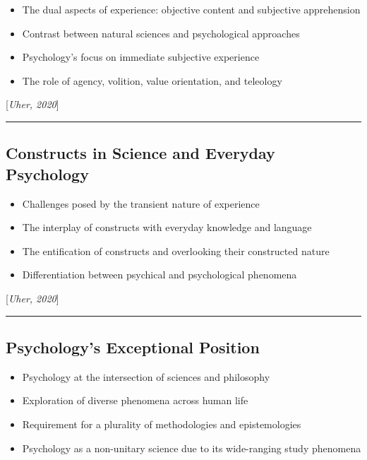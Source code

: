 \documentclass[
  letterpaper,
  DIV=11,
  numbers=noendperiod]{scrartcl}
\providecommand{\tightlist}{%
  \setlength{\itemsep}{0pt}\setlength{\parskip}{0pt}}\usepackage{longtable,booktabs,array}
\begin{document}
\begin{itemize}
\tightlist
\item
  The dual aspects of experience: objective content and subjective
  apprehension
\item
  Contrast between natural sciences and psychological approaches
\item
  Psychology's focus on immediate subjective experience
\item
  The role of agency, volition, value orientation, and teleology
\end{itemize}

{[}\emph{Uher, 2020}{]}

\begin{center}\rule{0.5\linewidth}{0.5pt}\end{center}

\subsection{Constructs in Science and Everyday
Psychology}\label{constructs-in-science-and-everyday-psychology}

\begin{itemize}
\tightlist
\item
  Challenges posed by the transient nature of experience
\item
  The interplay of constructs with everyday knowledge and language
\item
  The entification of constructs and overlooking their constructed
  nature
\item
  Differentiation between psychical and psychological phenomena
\end{itemize}

{[}\emph{Uher, 2020}{]}

\begin{center}\rule{0.5\linewidth}{0.5pt}\end{center}

\subsection{Psychology's Exceptional
Position}\label{psychologys-exceptional-position}

\begin{itemize}
\tightlist
\item
  Psychology at the intersection of sciences and philosophy
\item
  Exploration of diverse phenomena across human life
\item
  Requirement for a plurality of methodologies and epistemologies
\item
  Psychology as a non-unitary science due to its wide-ranging study
  phenomena
\end{itemize}
\end{document}
